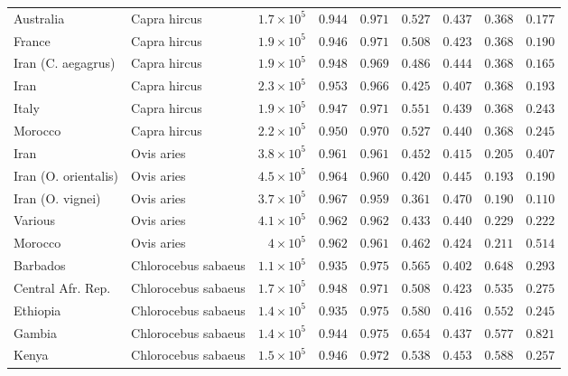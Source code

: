 \documentclass[10pt,letterpaper]{article}
\begin{document}
\begin{table}[!ht]
\begin{adjustwidth}{-2.25in}{0in}
\begin{tabular}{||l|l|r||r|r||r|r||r|r||}
\rowcolor{LIGHTGREY} Australia & Capra hircus & $1.7\times 10^{5}$ & $ 0.944$ & $ 0.971$ & $ 0.527$ & $ 0.437$ & $ 0.368$ & $ 0.177$ \\
\rowcolor{LIGHTGREY} France & Capra hircus & $1.9\times 10^{5}$ & $ 0.946$ & $ 0.971$ & $ 0.508$ & $ 0.423$ & $ 0.368$ & $ 0.190$ \\
\rowcolor{LIGHTGREY} Iran (C. aegagrus) & Capra hircus & $1.9\times 10^{5}$ & $ 0.948$ & $ 0.969$ & $ 0.486$ & $ 0.444$ & $ 0.368$ & $ 0.165$ \\
\rowcolor{LIGHTGREY} Iran & Capra hircus & $2.3\times 10^{5}$ & $ 0.953$ & $ 0.966$ & $ 0.425$ & $ 0.407$ & $ 0.368$ & $ 0.193$ \\
\rowcolor{LIGHTGREY} Italy & Capra hircus & $1.9\times 10^{5}$ & $ 0.947$ & $ 0.971$ & $ 0.551$ & $ 0.439$ & $ 0.368$ & $ 0.243$ \\
\rowcolor{LIGHTGREY} Morocco & Capra hircus & $2.2\times 10^{5}$ & $ 0.950$ & $ 0.970$ & $ 0.527$ & $ 0.440$ & $ 0.368$ & $ 0.245$ \\
Iran & Ovis aries & $3.8\times 10^{5}$ & $ 0.961$ & $ 0.961$ & $ 0.452$ & $ 0.415$ & $ 0.205$ & $ 0.407$ \\
Iran (O. orientalis) & Ovis aries & $4.5\times 10^{5}$ & $ 0.964$ & $ 0.960$ & $ 0.420$ & $ 0.445$ & $ 0.193$ & $ 0.190$ \\
Iran (O. vignei) & Ovis aries & $3.7\times 10^{5}$ & $ 0.967$ & $ 0.959$ & $ 0.361$ & $ 0.470$ & $ 0.190$ & $ 0.110$ \\
Various & Ovis aries & $4.1\times 10^{5}$ & $ 0.962$ & $ 0.962$ & $ 0.433$ & $ 0.440$ & $ 0.229$ & $ 0.222$ \\
Morocco & Ovis aries & $ 4\times 10^{5}$ & $ 0.962$ & $ 0.961$ & $ 0.462$ & $ 0.424$ & $ 0.211$ & $ 0.514$ \\
\rowcolor{LIGHTGREY} Barbados & Chlorocebus sabaeus & $1.1\times 10^{5}$ & $ 0.935$ & $ 0.975$ & $ 0.565$ & $ 0.402$ & $ 0.648$ & $ 0.293$ \\
\rowcolor{LIGHTGREY} Central Afr. Rep. & Chlorocebus sabaeus & $1.7\times 10^{5}$ & $ 0.948$ & $ 0.971$ & $ 0.508$ & $ 0.423$ & $ 0.535$ & $ 0.275$ \\
\rowcolor{LIGHTGREY} Ethiopia & Chlorocebus sabaeus & $1.4\times 10^{5}$ & $ 0.935$ & $ 0.975$ & $ 0.580$ & $ 0.416$ & $ 0.552$ & $ 0.245$ \\
\rowcolor{LIGHTGREY} Gambia & Chlorocebus sabaeus & $1.4\times 10^{5}$ & $ 0.944$ & $ 0.975$ & $ 0.654$ & $ 0.437$ & $ 0.577$ & $ 0.821$ \\
\rowcolor{LIGHTGREY} Kenya & Chlorocebus sabaeus & $1.5\times 10^{5}$ & $ 0.946$ & $ 0.972$ & $ 0.538$ & $ 0.453$ & $ 0.588$ & $ 0.257$ \\

\end{tabular}
\end{adjustwidth}
\end{table}
\end{document}
